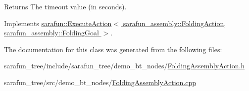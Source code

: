 \begin{DoxyReturn}{Returns}
The timeout value (in seconds). 
\end{DoxyReturn}


Implements \hyperlink{classsarafun_1_1ExecuteAction_aba6cfa8a8ce19e735eb6394424df6d17}{sarafun\-::\-Execute\-Action$<$ sarafun\-\_\-assembly\-::\-Folding\-Action, sarafun\-\_\-assembly\-::\-Folding\-Goal $>$}.



The documentation for this class was generated from the following files\-:\begin{DoxyCompactItemize}
\item 
sarafun\-\_\-tree/include/sarafun\-\_\-tree/demo\-\_\-bt\-\_\-nodes/\hyperlink{FoldingAssemblyAction_8h}{Folding\-Assembly\-Action.\-h}\item 
sarafun\-\_\-tree/src/demo\-\_\-bt\-\_\-nodes/\hyperlink{FoldingAssemblyAction_8cpp}{Folding\-Assembly\-Action.\-cpp}\end{DoxyCompactItemize}
